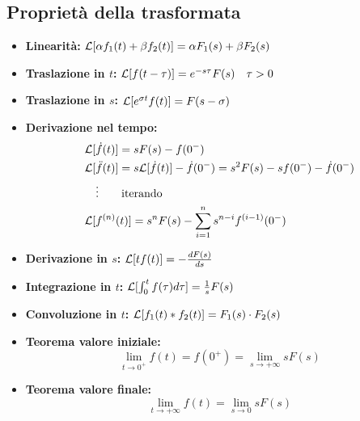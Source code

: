 \subsection{Proprietà della trasformata}
\begin{itemize}
 \item \textbf{Linearità:} $
  \mathcal{L} [\alpha f_1(t) + \beta f_2(t)] = \alpha F_1(s) + \beta F_2(s)
 $
 \item \textbf{Traslazione in $t$:} $
 \mathcal{L}[ f(t-\tau)  ] = e^{-s\tau}F(s) \quad \tau>0
 $
 \item \textbf{Traslazione in $s$:} $
 \mathcal{L}[e^{\sigma t}f(t)] = F(s-\sigma)
 $
 \item \textbf{Derivazione nel tempo:}
 $$\begin{aligned}
  \mathcal{L}[&\dot{f}(t)]  = sF(s) - f(0^{-})\\
 \mathcal{L}[&\ddot{f}(t)] = s\mathcal{L}[\dot f(t)] - \dot{f}(0^-) = s^2 F(s) - sf(0^-) -
\dot{f}(0^-)\\
&\vdots \qquad \text{iterando}\\
\mathcal{L}[&f^{(n)}(t)]= s^nF(s) - \sum_{i=1}^n s^{n-i}f^{(i-1)}(0^-)
 \end{aligned}$$
 \item \textbf{Derivazione in $s$:} $\mathcal{L} [tf(t)]=
 -\frac{dF(s)}{ds}
 $
 \item \textbf{Integrazione in $t$:} $
 \mathcal{L}[\int_0^tf(\tau)d\tau] = \frac{1}{s}F(s)
 $
 \item \textbf{Convoluzione in $t$:} $
 \mathcal{L}[f_1(t)*f_2(t)] = F_1(s)\cdot F_2(s)
 $
 \item \textbf{Teorema valore iniziale:} $$
 \lim_{t\to 0^+} f(t) = f(0^+) = \lim_{s\to +\infty} sF(s)
 $$
 \item \textbf{Teorema valore finale:} $$
 \lim_{t\to + \infty} f(t) = \lim_{s\to 0} s F(s)
 $$
\end{itemize}

